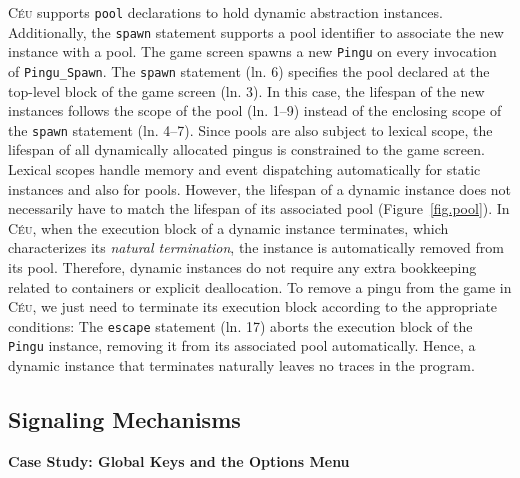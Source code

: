 \documentclass{vgtc}                          %
\newcommand{\CEU}{\textsc{C\'{e}u}\xspace}
\newcommand{\code}[1] {{\small{\texttt{#1}}}}
\begin{document}
\CEU supports \code{pool} declarations to hold dynamic abstraction instances.
Additionally, the \code{spawn} statement supports a pool identifier to
associate the new instance with a pool.
%
The game screen spawns a new \code{Pingu} on every invocation of
\code{Pingu\_Spawn}.
%
The \code{spawn} statement (ln. 6) specifies the pool declared at the top-level
block of the game screen (ln. 3).
In this case, the lifespan of the new instances follows the scope of the pool
(ln. 1--9) instead of the enclosing scope of the \code{spawn} statement
(ln. 4--7).
Since pools are also subject to lexical scope, the lifespan of all dynamically
allocated pingus is constrained to the game screen.
%
Lexical scopes handle memory and event dispatching automatically for static
instances and also for pools.
However, the lifespan of a dynamic instance does not necessarily have to match
the lifespan of its associated pool (Figure~\ref{fig.pool}).
In \CEU, when the execution block of a dynamic instance terminates, which
characterizes its \emph{natural termination}, the instance is automatically
removed from its pool.
Therefore, dynamic instances do not require any extra bookkeeping related to 
containers or explicit deallocation.
%
To remove a pingu from the game in \CEU, we just need to terminate its execution
block according to the appropriate conditions:
%
The \code{escape} statement (ln. 17) aborts the execution block of the
\code{Pingu} instance, removing it from its associated pool automatically.
Hence, a dynamic instance that terminates naturally leaves no traces in the 
program.

\subsection{Signaling Mechanisms}

\textbf{Case Study: Global Keys and the Options Menu}

\end{document}
